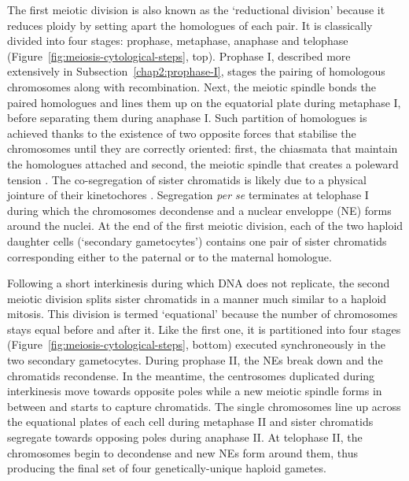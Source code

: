 The first meiotic division is also known as the ‘reductional division’ because it reduces ploidy by setting apart the homologues of each pair.
It is classically divided into four stages: prophase, metaphase, anaphase and telophase (Figure~\ref{fig:meiosis-cytological-steps}, top).
Prophase I, described more extensively in Subsection~\ref{chap2:prophase-I}, stages the pairing of homologous chromosomes along with recombination.
Next, the meiotic spindle bonds the paired homologues and lines them up on the equatorial plate during metaphase I, before separating them during anaphase I. 
Such partition of homologues is achieved thanks to the existence of two opposite forces that stabilise the chromosomes until they are correctly oriented: first, the chiasmata that maintain the homologues attached and second, the meiotic spindle that creates a poleward tension \citep{petronczki2003menage}.
The co-segregation of sister chromatids is likely due to a physical jointure of their kinetochores \citep{nasmyth2015meiotic}.
Segregation \textit{per se} terminates at telophase I during which the chromosomes decondense and a nuclear enveloppe (NE) forms around the nuclei.
At the end of the first meiotic division, each of the two haploid daughter cells (‘secondary gametocytes’) contains one pair of sister chromatids corresponding either to the paternal or to the maternal homologue.

Following a short interkinesis during which DNA does not replicate, the second meiotic division splits sister chromatids in a manner much similar to a haploid mitosis. 
This division is termed ‘equational’ because the number of chromosomes stays equal before and after it.
Like the first one, it is partitioned into four stages (Figure~\ref{fig:meiosis-cytological-steps}, bottom) executed synchroneously in the two secondary gametocytes.
During prophase II, the NEs break down and the chromatids recondense. 
In the meantime, the centrosomes duplicated during interkinesis move towards opposite poles while a new meiotic spindle forms in between and starts to capture chromatids.
The single chromosomes line up across the equational plates of each cell during metaphase II and sister chromatids segregate towards opposing poles during anaphase II\@.
At telophase II, the chromosomes begin to decondense and new NEs form around them, thus producing the final set of four genetically-unique haploid gametes.\\

